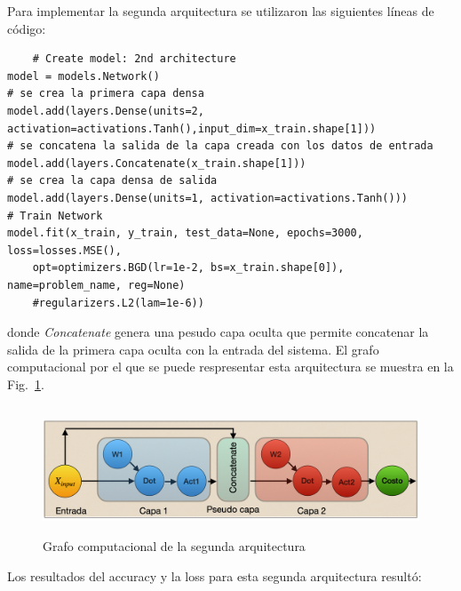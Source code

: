 Para implementar la segunda arquitectura se utilizaron las siguientes líneas de código:

\begin{verbatim}
    # Create model: 2nd architecture
model = models.Network()
# se crea la primera capa densa
model.add(layers.Dense(units=2, activation=activations.Tanh(),input_dim=x_train.shape[1])) 
# se concatena la salida de la capa creada con los datos de entrada
model.add(layers.Concatenate(x_train.shape[1]))
# se crea la capa densa de salida
model.add(layers.Dense(units=1, activation=activations.Tanh()))
# Train Network
model.fit(x_train, y_train, test_data=None, epochs=3000, loss=losses.MSE(), 
    opt=optimizers.BGD(lr=1e-2, bs=x_train.shape[0]), name=problem_name, reg=None)
    #regularizers.L2(lam=1e-6))
\end{verbatim}
donde \textit{Concatenate} genera una pesudo capa oculta que permite concatenar la salida de la primera capa oculta con la entrada del sistema. El grafo computacional por el que se puede respresentar esta arquitectura se muestra en la Fig.~\ref{fig:graph8b}.

\begin{figure}
    \centering
    \includegraphics[height=1.5in]{image/graph_8_b.png}
    \caption{Grafo computacional de la segunda arquitectura}
    \label{fig:graph8b}
\end{figure}

Los resultados del accuracy y la loss para esta segunda arquitectura resultó:

